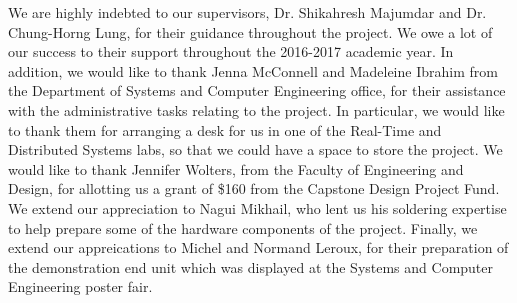 \documentclass[12pt]{report}
\begin{document}
We are highly indebted to our supervisors, Dr. Shikahresh Majumdar and Dr. Chung-Horng Lung, for their guidance 
throughout the project. We owe a lot of our success to their support throughout the 2016-2017 academic year.
In addition, we would like to thank Jenna McConnell and Madeleine Ibrahim from the Department of Systems and Computer 
Engineering office, for their assistance with the administrative tasks relating to the project. In particular, we would 
like to thank them for arranging a desk for us in one of the Real-Time and Distributed Systems labs, so that we could 
have a space to store the project.
We would like to thank Jennifer Wolters, from the Faculty of Engineering and Design, for allotting us a grant of \$160 
from the Capstone Design Project Fund.
We extend our appreciation to Nagui Mikhail, who lent us his soldering expertise to help prepare some of the hardware 
components of the project.
Finally, we extend our appreications to Michel and Normand Leroux, for their preparation of the demonstration end unit 
which was displayed at the Systems and Computer Engineering poster fair.



\prefaceTOC   %
\listoffigures   %
\listoftables   %

                    
    
\end{document}
